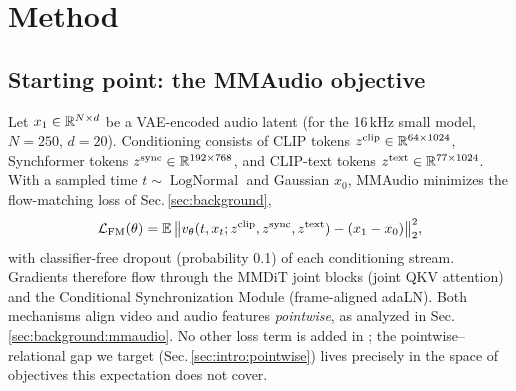 \section{Method}
\label{sec:method}

\subsection{Starting point: the MMAudio objective}
\label{sec:method:baseline}
Let $x_1 \in \mathbb{R}^{N \times d}$ be a VAE-encoded audio latent (for
the 16\,kHz small model, $N=250$, $d=20$). Conditioning consists of
CLIP tokens $z^{\text{clip}} \in \mathbb{R}^{64 \times 1024}$,
Synchformer tokens $z^{\text{sync}} \in \mathbb{R}^{192 \times 768}$, and
CLIP-text tokens $z^{\text{text}} \in \mathbb{R}^{77 \times 1024}$. With a
sampled time $t \sim \operatorname{LogNormal}$ and Gaussian
$x_0$, MMAudio minimizes the flow-matching loss of
Sec.\,\ref{sec:background},
\begin{equation}
  \mathcal{L}_{\mathrm{FM}}(\theta) = \mathbb{E}\,
    \bigl\lVert v_\theta(t, x_t; z^{\text{clip}}, z^{\text{sync}},
      z^{\text{text}}) - (x_1 - x_0) \bigr\rVert_2^2,
\end{equation}
with classifier-free dropout (probability 0.1) of each conditioning
stream. Gradients therefore flow through the MMDiT joint blocks
(joint QKV attention) and the Conditional Synchronization
Module (frame-aligned adaLN). Both mechanisms align video and
audio features \emph{pointwise}, as analyzed in
Sec.\,\ref{sec:background:mmaudio}. No other loss term is added
in \citet{cheng2024mmaudio}; the pointwise--relational gap we
target (Sec.\,\ref{sec:intro:pointwise}) lives precisely in the
space of objectives this expectation does not cover.

